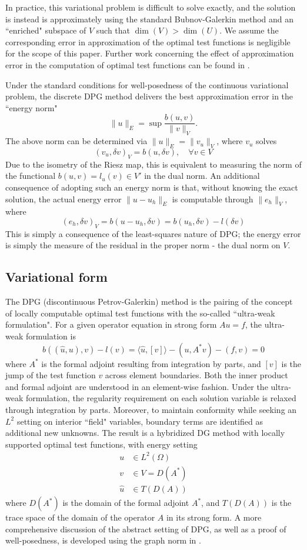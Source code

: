 \documentclass[11pt,onecolumn]{scrartcl}
\begin{document}
In practice, this variational problem is difficult to solve exactly, and the solution is instead is approximately using the standard Bubnov-Galerkin method and an ``enriched" subspace of $V$ such that $\dim(V) > \dim(U)$. We assume the corresponding error in approximation of the optimal test functions is negligible for the scope of this paper.  Further work concerning the effect of approximation error in the computation of optimal test functions can be found in \cite{practicalDPG}.

Under the standard conditions for well-posedness of the continuous variational problem, the discrete DPG method delivers the best approximation error in the ``energy norm" 
\[
\|u\|_E = \sup \frac{b(u,v)}{\|v\|_V}.
\]
The above norm can be determined via $\|u\|_E = \|v_u\|_V$, where $v_u$ solves
\[
(v_u,\delta v)_V = b(u,\delta v), \quad \forall v \in V
\]
Due to the isometry of the Riesz map, this is equivalent to measuring the norm of the functional $b(u,v) = l_u(v)\in V'$ in the dual norm. An additional consequence of adopting such an energy norm is that, without knowing the exact solution, the actual energy error $\|u-u_h\|_E$ is computable through $\|e_h\|_V$, where
\[
\left(e_h,\delta v\right)_V = b(u-u_h,\delta v) = b(u_h,\delta v)-l(\delta v)
\]
This is simply a consequence of the least-squares nature of DPG; the energy error is simply the measure of the residual in the proper norm - the dual norm on $V$.  

\subsection{Variational form}

The DPG (discontinuous Petrov-Galerkin) method is the pairing of the concept of locally computable optimal test functions with the so-called ``ultra-weak formulation". For a given operator equation in strong form $Au = f$, the ultra-weak formulation is
\[
b\left(\left(\widehat{u},u\right),v\right) - l(v) = \langle \widehat{u}, [v] \rangle - (u,A^*v) - (f,v) = 0
\]
where $A^*$ is the formal adjoint resulting from integration by parts, and $[v]$ is the jump of the test function $v$ across element boundaries.  Both the inner product and formal adjoint are understood in an element-wise fashion. Under the ultra-weak formulation, the regularity requirement on each solution variable is relaxed through integration by parts.  Moreover, to maintain conformity while seeking an $L^2$ setting on interior ``field" variables, boundary terms are identified as additional new unknowns.  The result is a hybridized DG method with locally supported optimal test functions, with energy setting 
\begin{align*}
u&\in L^2(\Omega)\\
v&\in V=D(A^*) \\
\widehat{u}&\in T(D(A))
\end{align*}
where $D(A^*)$ is the domain of the formal adjoint $A^*$, and $T(D(A))$ is the trace space of the domain of the operator $A$ in its strong form. A more comprehensive discussion of the abstract setting of DPG, as well as a proof of well-posedness, is developed using the graph norm in \cite{DPGFriedrichs}.
\end{document}
